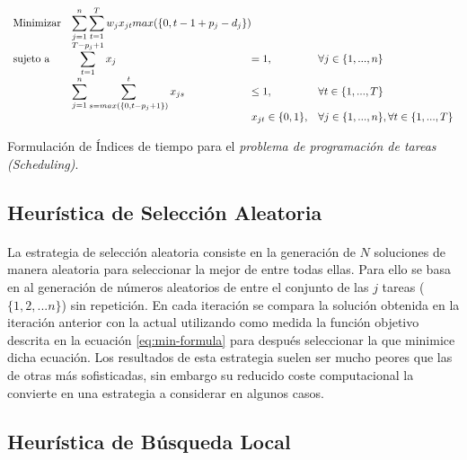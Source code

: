 \documentclass[spanish]{article}
\begin{document}
			\begin{eqfloat}
				\begin{equation}
					\begin{array}{ll@{}ll}
						\text{Minimizar}	& \displaystyle\sum\limits_{j = 1}^{n}\displaystyle\sum\limits_{t = 1}^{T} w_{j}x_{jt}max(\{0, t-1+p_{j}-d_{j}\}) && \\
						\text{sujeto a}		& \displaystyle\sum\limits_{t = 1}^{T - p_{j}+ 1} x_{j} &= 1, & \forall j \in \{1,...,n\}\\
															&	\displaystyle\sum\limits_{j = 1}^{n} \displaystyle\sum\limits_{s = max(\{0,t-p_{j}+1\})}^{t} x_{js} &\leq 1, 	& \forall t \in \{1,...,T\}\\
															&                               				&	x_{jt} 	\in \{0,1\}, 	& \forall j \in \{1,...,n\},  \forall t \in \{1,...,T\}
					\end{array}
				\end{equation}
				\caption{Formulación de Índices de tiempo para el \emph{problema de programación de tareas (Scheduling)}.}
				\label{eq:time-index-formulation}
			\end{eqfloat}

		\subsection{Heurística de Selección Aleatoria}
		\label{sec:random-heuristic}

			\paragraph{}
			La estrategia de selección aleatoria consiste en la generación de $N$ soluciones de manera aleatoria para seleccionar la mejor de entre todas ellas. Para ello se basa en al generación de números aleatorios de entre el conjunto de las $j$ tareas ($\{1,2,...n\}$) sin repetición. En cada iteración se compara la solución obtenida en la iteración anterior con la actual utilizando como medida la función objetivo descrita en la ecuación \eqref{eq:min-formula} para después seleccionar la que minimice dicha ecuación. Los resultados de esta estrategia suelen ser mucho peores que las de otras más sofisticadas, sin embargo su reducido coste computacional la convierte en una estrategia a considerar en algunos casos.

		\subsection{Heurística de Búsqueda Local}
		\label{sec:local-search-heuristic}
\end{document}
